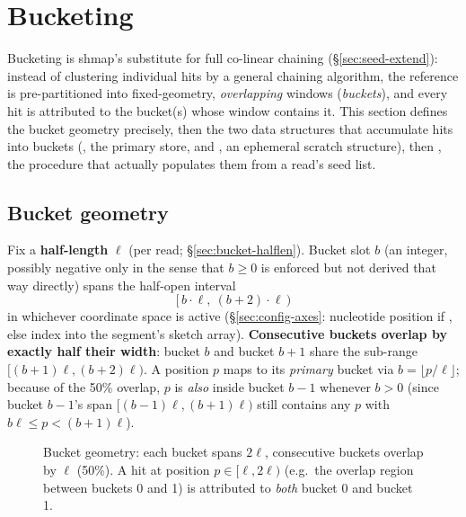 \chapter{Bucketing}
\label{ch:bucketing}

Bucketing is shmap's substitute for full co-linear chaining (\S\ref{sec:seed-extend}): instead of
clustering individual hits by a general chaining algorithm, the reference is pre-partitioned into
fixed-geometry, \emph{overlapping} windows (\emph{buckets}), and every hit is attributed to the
bucket(s) whose window contains it. This section defines the bucket geometry precisely, then the
two data structures that accumulate hits into buckets (, the primary store, and
, an ephemeral scratch structure), then , the procedure that
actually populates them from a read's seed list.

\section{Bucket geometry}
\label{sec:bucket-geometry}

Fix a \textbf{half-length} $\ell$ (per read; \S\ref{sec:bucket-halflen}). Bucket slot $b$ (an
integer, possibly negative only in the sense that $b\ge 0$ is enforced but not derived that way
directly) spans the half-open interval
\[
  \bigl[\,b\cdot\ell,\ (b+2)\cdot\ell\,\bigr)
\]
in whichever coordinate space is active (\S\ref{sec:config-axes}: nucleotide position if
, else index into the segment's sketch array). \textbf{Consecutive buckets overlap
by exactly half their width}: bucket $b$ and bucket $b{+}1$ share the sub-range $[(b{+}1)\ell,
(b{+}2)\ell)$. A position $p$ maps to its \emph{primary} bucket via $b = \lfloor p/\ell \rfloor$;
because of the 50\% overlap, $p$ is \emph{also} inside bucket $b{-}1$ whenever $b>0$ (since bucket
$b{-}1$'s span $[(b{-}1)\ell, (b{+}1)\ell)$ still contains any $p$ with $b\ell \le p <
(b{+}1)\ell$).

\begin{figure}[htbp]
\centering
{}
\caption{Bucket geometry: each bucket spans $2\ell$, consecutive buckets overlap by $\ell$
(50\%). A hit at position $p \in [\ell, 2\ell)$ (e.g.\ the overlap region between buckets 0 and 1)
is attributed to \emph{both} bucket 0 and bucket 1.}
\end{figure}

